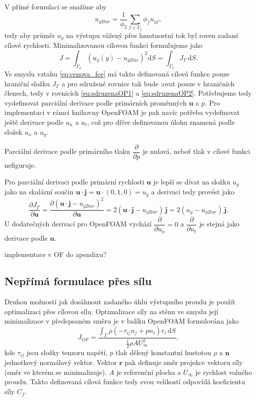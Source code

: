 V přímé formulaci se snažíme aby
\begin{equation}
	u_{y2tar}=\dfrac{1}{\phi_2}\sum_{f\in\Gamma_2}\phi_f u_{yf},
\end{equation}
tedy aby průměr $ u_y $ na výstupu vážený přes hmotnostní tok byl roven zadané cílové rychlosti.
Minimalizovanou cílovou funkci formulujeme jako
\begin{equation}\label{eq:J_UyTarget}
	J = \int_{\Gamma_2}\left( u_y(y)-u_{y2tar} \right)^2\mathrm{d}S = \int_{\Gamma_2} J_\Gamma\, \mathrm{d}S.
\end{equation}
Ve smyslu vztahu \ref{eq:cenova_fce} má takto definovaná cílová funkce pouze hraniční složku $ J_\Gamma $ a pro sdružené rovnice tak bude ;ovat pouze v hraničních členech, tedy v rovnicích \ref{eq:sdruzenaOP1} a \ref{eq:sdruzenaOP2}. Potřebujeme tedy vydefinovat parciální derivace podle primárních proměnných $ \mathbf{u} $ a $ p $. Pro implementaci v rámci knihovny OpenFOAM je pak navíc potřeba vydefinovat ještě derivace podle $ u_n $ a $ u_t $, což pro dříve definovanou úlohu znamená podle složek $ u_x $ a $ u_y $.

Parciální derivace podle primárního tlaku $ \dfrac{\partial}{\partial p} $ je nulová, neboť tlak v cílové funkci nefiguruje.

Pro parciální derivaci podle primární rychlosti $ \mathbf{u} $ je lepší se dívat na složku $ u_y $ jako na skalární součin $ \mathbf{u}\cdot \mathbf{j}=\mathbf{u}\cdot (0,1,0) = u_y$ a derivaci tedy provést jako
\begin{equation}\label{key}
\dfrac{\partial J_\Gamma}{\partial \mathbf{u}}
=
\dfrac{\partial \left( \mathbf{u}\cdot \mathbf{j}-u_{y2tar} \right)^2}{\partial \mathbf{u}}
=
2( \mathbf{u}\cdot \mathbf{j}-u_{y2tar} )\,\mathbf{j}
=
2( u_y-u_{y2tar} )\,\mathbf{j}.
\end{equation}
U dodatečných derivací pro OpenFOAM vychází $ \dfrac{\partial}{\partial u_n}=0 $ a $ \dfrac{\partial }{\partial u_t} $ je stejná jako derivace podle $ \mathbf{u} $.

implementace v OF do apendixu?

\subsection{Nepřímá formulace přes sílu}

Druhou možností jak dosáhnout zadaného úhlu výstupního proudu je použít optimalizaci přes cílovou sílu. 
Optimalizace síly na stěnu ve smyslu její minimalizace v předepsaném směru je v balíku OpenFOAM formulována jako
\begin{equation}\label{eq:J_FyOForig}
J_{OF}=\dfrac{\int_\Gamma \rho (-\tau_{ij}n_j+pn_i)r_i\,\mathrm{d}S}{\frac{1}{2}\rho A U_{\infty}^2},
\end{equation}
kde $ \tau_{ij} $ jsou složky tenzoru napětí, $ p $ tlak dělený konstantní hustotou $ \rho $ a $ \mathbf{n} $ jednotkový normálový vektor. Vektor $ \mathbf{r} $ pak definuje směr projekce vektoru síly (směr ve kterém se minimalizuje). $ A $ je referenční plocha a $ U_{\infty} $ je rychlost volného proudu. Takto definovaná cílová funkce tedy svou velikostí odpovídá koeficientu síly $ C_f $.

